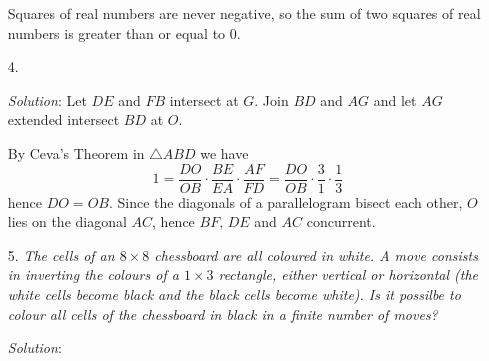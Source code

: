 \documentclass{article}
\begin{document}
\begin{enumerate}[1.]
Squares of real numbers are never negative, so the sum of two squares of real numbers is greater than or equal to 0.\\

\vspace{6.81mm}

\item[4.] %
\textit{}

\textit{Solution}:
Let $DE$ and $FB$ intersect at $G$. Join $BD$ and $AG$ and let $AG$ extended intersect $BD$ at $O$.

By Ceva's Theorem in $\triangle ABD$ we have
$$1 = \frac{DO}{OB} \cdot \frac{BE}{EA} \cdot \frac{AF}{FD} = \frac{DO}{OB} \cdot \frac{3}{1} \cdot \frac{1}{3}$$
hence $DO = OB$. Since the diagonals of a parallelogram bisect each other, $O$ lies on the diagonal $AC$, hence $BF$, $DE$ and $AC$ concurrent.
\vspace{6.81mm}

\item[5.] %
\textit{The cells of an $8 \times 8$ chessboard are all coloured in white. A move consists in inverting the colours of a $1 \times 3$ rectangle, either vertical or horizontal (the white cells become black and the black cells become white).
Is it possilbe to colour all cells of the chessboard in black in a finite number of moves?}

\textit{Solution}: 


\end{enumerate}
\end{document}
